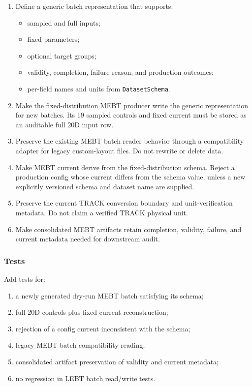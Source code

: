 \documentclass[
]{article}
\providecommand{\tightlist}{%
  \setlength{\itemsep}{0pt}\setlength{\parskip}{0pt}}
\begin{document}
\begin{enumerate}
\def\labelenumi{\arabic{enumi}.}
\tightlist
\item
  Define a generic batch representation that supports:

  \begin{itemize}
  \tightlist
  \item
    sampled and full inputs;
  \item
    fixed parameters;
  \item
    optional target groups;
  \item
    validity, completion, failure reason, and production outcomes;
  \item
    per-field names and units from \texttt{DatasetSchema}.
  \end{itemize}
\item
  Make the fixed-distribution MEBT producer write the generic
  representation for new batches. Its 19 sampled controls and fixed
  current must be stored as an auditable full 20D input row.
\item
  Preserve the existing MEBT batch reader behavior through a
  compatibility adapter for legacy custom-layout files. Do not rewrite
  or delete data.
\item
  Make MEBT current derive from the fixed-distribution schema. Reject a
  production config whose current differs from the schema value, unless
  a new explicitly versioned schema and dataset name are supplied.
\item
  Preserve the current TRACK conversion boundary and unit-verification
  metadata. Do not claim a verified TRACK physical unit.
\item
  Make consolidated MEBT artifacts retain completion, validity, failure,
  and current metadata needed for downstream audit.
\end{enumerate}

\hypertarget{tests-9}{%
\subsubsection{Tests}\label{tests-9}}

Add tests for:

\begin{enumerate}
\def\labelenumi{\arabic{enumi}.}
\tightlist
\item
  a newly generated dry-run MEBT batch satisfying its schema;
\item
  full 20D controls-plus-fixed-current reconstruction;
\item
  rejection of a config current inconsistent with the schema;
\item
  legacy MEBT batch compatibility reading;
\item
  consolidated artifact preservation of validity and current metadata;
\item
  no regression in LEBT batch read/write tests.
\end{enumerate}
\end{document}
